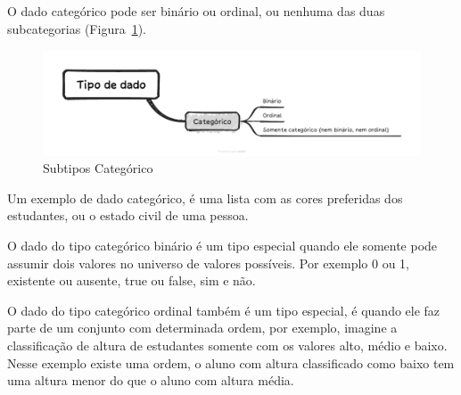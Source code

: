 \documentclass[a4paper,12pt]{book}
\begin{document}
	O dado categórico pode ser binário ou ordinal, ou nenhuma das duas subcategorias (Figura~\ref{fig:categoricossubtipos}). 
	
	\begin{figure}
		\centering
		\includegraphics[width=1\linewidth]{figuras/tipo_do_dado_categorico.png}
		\caption{Subtipos Categórico}
		\label{fig:categoricossubtipos}
	\end{figure}
	
	Um exemplo de dado categórico, é uma lista com as cores preferidas dos estudantes, ou o estado civil de uma pessoa.
	
	O dado do tipo categórico binário é um tipo especial quando ele somente pode assumir dois valores no universo de valores possíveis. Por exemplo 0 ou 1, existente ou ausente, true ou false, sim e não.
	
	O dado do tipo categórico ordinal também é um tipo especial, é quando ele faz parte de um conjunto com determinada ordem, por exemplo, imagine a classificação de altura de estudantes somente com os valores alto, médio e baixo. Nesse exemplo existe uma ordem, o aluno com altura classificado como baixo tem uma altura menor do que o aluno com altura média.
	
	


	
\end{document}
